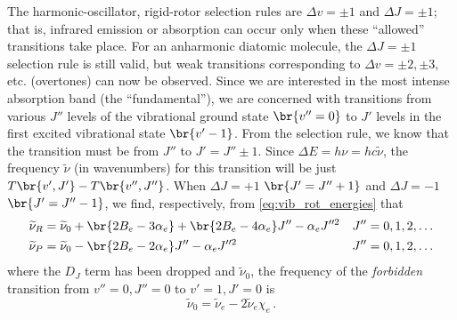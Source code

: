\documentclass[nobib,nofonts,nols,nohyper]{tufte-handout}
\begin{document}
The harmonic-oscillator, rigid-rotor selection rules\autocite{herzberg89} are \( \Delta v = \pm 1 \) and \( \Delta J = \pm 1\); that is, infrared emission or absorption can occur only when these ``allowed'' transitions take place. 
For an anharmonic diatomic molecule, the \( \Delta J = \pm 1 \) selection rule is still valid, but weak transitions corresponding to \( \Delta v = \pm2, \pm3, \) etc. (overtones) can now be observed\autocite{herzberg89}. 
Since we are interested in the most intense absorption band (the ``fundamental''), we are concerned with transitions from various \( J'' \) levels of the vibrational ground state \( \br{v'' = 0} \) to \( J' \) levels in the first excited vibrational state \( \br{v' - 1} \). 
From the selection rule, we know that the transition must be from \( J'' \) to \( J' = J'' \pm 1 \). 
Since \( \Delta E = h \nu = h c \widetilde{\nu} \), the frequency \( \widetilde{\nu} \) (in wavenumbers) for this transition will be just \( T\br{v', J'} - T\br{v'', J''} \). When \( \Delta J = +1 \) \( \br{J' = J'' + 1} \) and \( \Delta J = -1 \) \( \br{J' = J'' - 1} \), we find, respectively, from \cref{eq:vib_rot_energies} that
\begin{align}
	\widetilde{\nu}_R &= \widetilde{\nu}_0 + \br{2 B_e - 3 \alpha_e} + \br{2 B_e - 4 \alpha_e} J'' - \alpha_e J''^2 	&	J'' &= 0, 1, 2, \ldots 
	\label{eq:r_branch} 
	\\
	\widetilde{\nu}_P &= \widetilde{\nu}_0 -													 \br{2 B_e - 2 \alpha_e} J'' - \alpha_e J''^2 	&	J'' &= 0, 1, 2, \ldots 
	\label{eq:p_branch}
\end{align}
where the \( D_J \) term has been dropped and \( \widetilde{\nu}_0 \), the frequency of the \emph{forbidden} transition from \( v'' = 0, J'' = 0 \) to \( v' = 1, J' = 0 \) is 
\begin{equation}
	\widetilde{\nu}_0 = \widetilde{\nu}_e - 2 \widetilde{\nu}_e \chi_e \, .
	\label{eq:forbid_transition}
\end{equation}
\end{document}
